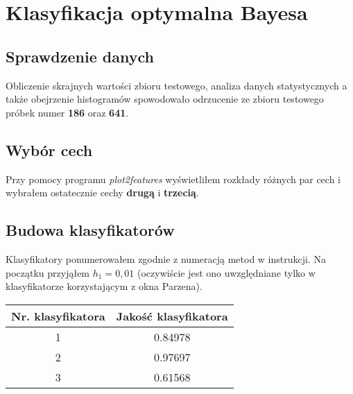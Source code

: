 \documentclass[12pt,a4paper,notitlepage]{article}
\begin{document}
\chead{}

\pagestyle{fancy}
\section*{Klasyfikacja optymalna Bayesa}
\subsection*{Sprawdzenie danych}
Obliczenie skrajnych wartości zbioru testowego, analiza danych statystycznych a także obejrzenie histogramów spowodowało odrzucenie ze zbioru testowego próbek numer \textbf{186} oraz \textbf{641}.
\subsection*{Wybór cech}
Przy pomocy programu \textit{plot2features} wyświetliłem rozkłady różnych par cech i wybrałem ostatecznie cechy \textbf{drugą} i \textbf{trzecią}.

\subsection*{Budowa klasyfikatorów}
Klasyfikatory ponumerowałem zgodnie z numeracją metod w instrukcji. Na początku przyjąłem $h_1 = 0,01$ (oczywiście jest ono uwzględniane tylko w klasyfikatorze korzystającym z okna Parzena).

\begin{center}
\begin{tabular}{|c|c|}
\hline
Nr. klasyfikatora	&	Jakość klasyfikatora \\\hline
	1				&		0.84978		\\\hline
	2				&		0.97697		\\\hline
	3				&		0.61568		\\\hline
\end{tabular}
\end{center}
\end{document}

